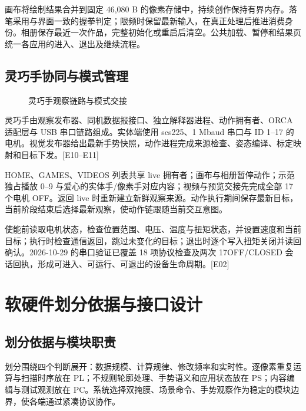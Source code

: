 画布将绘制结果合并到固定 46,080 B 的像素存储中，持续创作保持有界内存。落笔采用与界面一致的握拳判定；限频时保留最新输入，在真正处理后推进消费身份。相册保存最近一次作品，完整初始化或重启后清空。公共加载、暂停和结果页统一各应用的进入、退出及继续流程。

\subsection{灵巧手协同与模式管理}
\begin{figure}[htbp]\centering\caption{灵巧手观察链路与模式交接}\label{fig:5}\end{figure}
灵巧手由观察发布器、同机数据报接口、独立解释器进程、动作拥有者、ORCA 适配层与 USB 串口链路组成。实体端使用 scs225、1 Mbaud 串口与 ID 1–17 的电机。视觉发布器给出最新手势快照，动作进程完成来源检查、姿态编译、标定映射和目标下发。[E10–E11]

HOME、GAMES、VIDEOS 列表共享 live 拥有者；画布与相册暂停动作；示范独占播放 0–9 与爱心的实体手/像素手对应内容；视频与预览交接先完成全部 17 个电机 OFF。返回 live 时重新建立新鲜观察来源。动作执行期间保存最新目标，当前阶段结束后选择最新观察，使动作链跟随当前交互意图。

使能前读取电机状态，检查位置范围、电压、温度与扭矩状态，并设置速度和当前目标；执行时检查通信返回，跳过未变化的目标；退出时逐个写入扭矩关闭并读回确认。2026-10-29 的串口验证已覆盖 18 项协议检查及两次 17OFF/CLOSED 会话回执，形成可进入、可运行、可退出的设备生命周期。[E02]

\clearpage
\section{软硬件划分依据与接口设计}
\subsection{划分依据与模块职责}
划分围绕四个判断展开：数据规模、计算规律、修改频率和实时性。逐像素重复运算与扫描时序放在 PL；不规则轮廓处理、手势语义和应用状态放在 PS；内容编辑与测试观测放在 PC。系统选择双掩膜、场景命令、手势观察作为稳定的模块边界，使各端通过紧凑协议协作。

